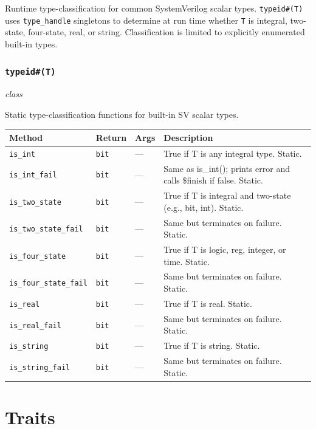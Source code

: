 \documentclass[11pt,letterpaper]{report}
\begin{document}
Runtime type-classification for common SystemVerilog scalar types. \texttt{typeid\#(T)} uses \texttt{type\_handle} singletons to determine at run time whether \texttt{T} is integral, two-state, four-state, real, or string. Classification is limited to explicitly enumerated built-in types.

\subsection*{\texttt{typeid\#(T)}}
\noindent\small\textit{class}\par

Static type-classification functions for built-in SV scalar types.

\begin{xltabular}{\linewidth}{>{\small}p{1.35in} >{\small}p{1.25in} >{\small}p{0.95in} >{\small}X}
\toprule
\textbf{Method} & \textbf{Return} & \textbf{Args} & \textbf{Description} \\
\midrule
\endhead
\bottomrule
\endfoot
\texttt{is\_int} & \texttt{bit} & --- & True if T is any integral type. Static. \\
\texttt{is\_int\_fail} & \texttt{bit} & --- & Same as is\_int(); prints error and calls \$finish if false. Static. \\
\texttt{is\_two\_state} & \texttt{bit} & --- & True if T is integral and two-state (e.g., bit, int). Static. \\
\texttt{is\_two\_state\_fail} & \texttt{bit} & --- & Same but terminates on failure. Static. \\
\texttt{is\_four\_state} & \texttt{bit} & --- & True if T is logic, reg, integer, or time. Static. \\
\texttt{is\_four\_state\_fail} & \texttt{bit} & --- & Same but terminates on failure. Static. \\
\texttt{is\_real} & \texttt{bit} & --- & True if T is real. Static. \\
\texttt{is\_real\_fail} & \texttt{bit} & --- & Same but terminates on failure. Static. \\
\texttt{is\_string} & \texttt{bit} & --- & True if T is string. Static. \\
\texttt{is\_string\_fail} & \texttt{bit} & --- & Same but terminates on failure. Static. \\
\end{xltabular}

\chapter{Traits}
\end{document}
